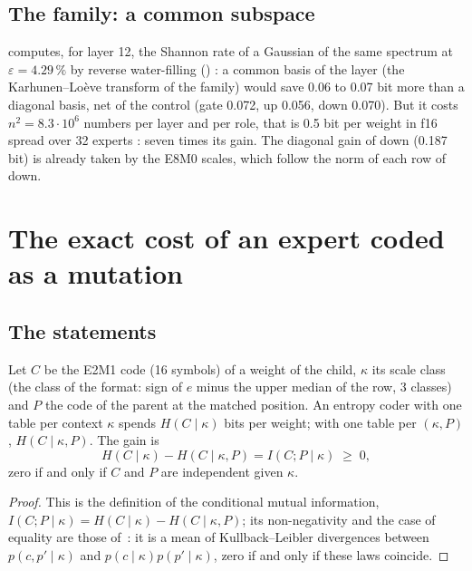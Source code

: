 \subsection{The family: a common subspace}

 computes, for layer 12, the Shannon rate of a Gaussian of the same spectrum at $\varepsilon = 4.29\,\%$ by reverse water-filling () \mes: a common basis of the layer (the Karhunen--Loève transform of the family) would save 0.06 to 0.07 bit more than a diagonal basis, net of the control (gate 0.072, up 0.056, down 0.070). But it costs $n^2 = 8.3\cdot10^6$ numbers per layer and per role, that is 0.5 bit per weight in f16 spread over 32 experts \calc: seven times its gain. The diagonal gain of down (0.187 bit) is already taken by the E8M0 scales, which follow the norm of each row of down.

\section{The exact cost of an expert coded as a mutation}\label{t3dup:sec:cout}

\subsection{The statements}

\begin{proposition}\label{t3dup:prop:im}
Let $C$ be the E2M1 code (16 symbols) of a weight of the child, $\kappa$ its scale class (the class of the format: sign of $e$ minus the upper median of the row, 3 classes) and $P$ the code of the parent at the matched position. An entropy coder with one table per context $\kappa$ spends $H(C \mid \kappa)$ bits per weight; with one table per $(\kappa, P)$, $H(C \mid \kappa, P)$. The gain is
\begin{equation}\label{t3dup:eq:im}
H(C \mid \kappa) - H(C \mid \kappa, P) = I(C ; P \mid \kappa) \;\ge\; 0,
\end{equation}
zero if and only if $C$ and $P$ are independent given $\kappa$.
\end{proposition}

\begin{proof}
This is the definition of the conditional mutual information, $I(C;P\mid\kappa) = H(C\mid\kappa) - H(C\mid\kappa,P)$; its non-negativity and the case of equality are those of~\cite[th. 2.6.5 and 2.5.2]{cover2006}: it is a mean of Kullback--Leibler divergences between $p(c, p'\mid\kappa)$ and $p(c\mid\kappa)p(p'\mid\kappa)$, zero if and only if these laws coincide.
\end{proof}

